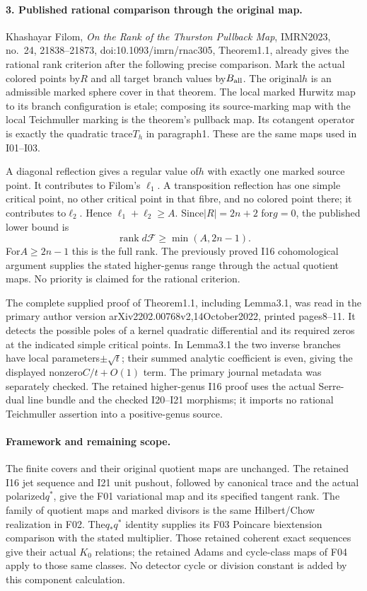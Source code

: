 \paragraph{3. Published rational comparison through the original map.}
Khashayar Filom, \emph{On the Rank of the Thurston Pullback
Map}, IMRN2023, no.~24, 21838--21873,
doi:10.1093/imrn/rnac305, Theorem1.1, already gives the
rational rank criterion after the following precise
comparison. Mark the actual colored points by$R$ and all
target branch values by$B_{\rm all}$. The original$h$
is an admissible marked sphere cover in that theorem.
The local marked Hurwitz map to its branch configuration
is etale; composing its source-marking map with the local
Teichmuller marking is the theorem's pullback map. Its
cotangent operator is exactly the quadratic trace$T_h$
in paragraph1. These are the same maps used in I01--I03.

A diagonal reflection gives a regular value of$h$ with
exactly one marked source point. It contributes to Filom's
$\ell_1$. A transposition reflection has one simple critical
point, no other critical point in that fibre, and no colored
point there; it contributes to$\ell_2$. Hence
$\ell_1+\ell_2\ge A$. Since$|R|=2n+2$ for$g=0$, the
published lower bound is
\[
       \operatorname{rank}d\mathcal F
                   \ge\min(A,2n-1).                  \tag{F1I04.15}
\]
For$A\ge2n-1$ this is the full rank. The previously proved I16 cohomological argument supplies
the stated higher-genus range through the actual quotient maps. No
priority is claimed for the rational criterion.

The complete supplied proof of Theorem1.1, including
Lemma3.1, was read in the primary author version
arXiv2202.00768v2,14October2022, printed pages8--11.
It detects the possible poles of a kernel quadratic
differential and its required zeros at the indicated
simple critical points. In Lemma3.1 the two inverse
branches have local parameters$\pm\sqrt t$; their summed
analytic coefficient is even, giving the displayed
nonzero$C/t+O(1)$ term. The primary journal metadata was
separately checked. The retained higher-genus I16 proof uses the
actual Serre-dual line bundle and the checked I20--I21
morphisms; it imports no rational
Teichmuller assertion into a positive-genus source.

\paragraph{Framework and remaining scope.}
The finite covers and their original quotient maps are
unchanged. The retained I16 jet sequence and I21 unit pushout,
followed by canonical trace and the actual
polarized$q^*$, give the F01 variational map and its
specified tangent rank. The family of quotient maps and
marked divisors is the same Hilbert/Chow realization in
F02. The$q_*q^*$ identity supplies its F03 Poincare
biextension comparison with the stated multiplier.
Those retained coherent exact sequences give their actual
$K_0$ relations; the retained Adams and cycle-class maps
of F04 apply to those same classes. No detector cycle or
division constant is added by this component calculation.

